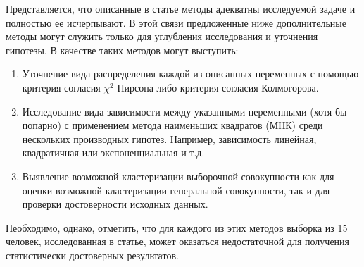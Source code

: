 \documentclass{../../common/thesisbyxetex}
\begin{document}
Представляется, что описанные в статье методы адекватны исследуемой задаче и полностью ее 
исчерпывают. В этой связи предложенные ниже дополнительные методы могут служить только для 
углубления исследования и уточнения гипотезы. В качестве таких методов могут выступить:
\begin{enumerate}
 \item Уточнение вида распределения каждой из описанных переменных с помощью критерия согласия 
$\chi^2$ Пирсона либо критерия согласия Колмогорова. 
 \item Исследование вида зависимости между указанными переменными (хотя бы попарно) с применением 
метода наименьших квадратов (МНК) среди нескольких производных гипотез. Например, зависимость 
линейная, квадратичная или экспоненциальная и т.д. 
 \item Выявление возможной кластеризации выборочной совокупности как для оценки возможной 
кластеризации генеральной совокупности, так и для проверки достоверности исходных данных.
\end{enumerate}

Необходимо, однако, отметить, что для каждого из этих методов выборка из 15 человек, исследованная 
в статье, может оказаться недостаточной для получения статистически достоверных результатов.  

 \printbibliography[env=gostbibliography,sorting=ntvy]
\end{document}
